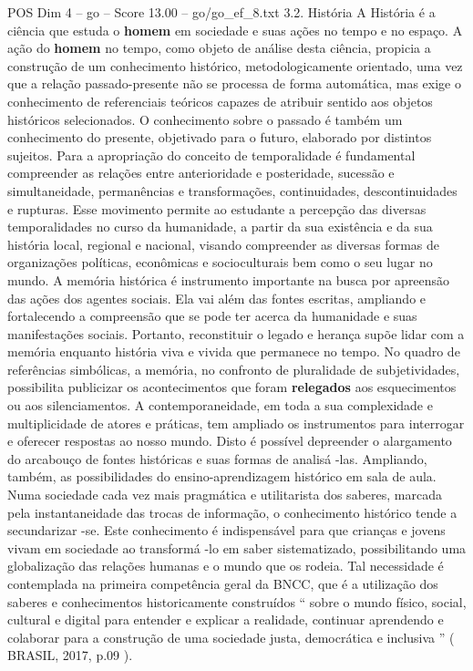 \begin{textsample}{POS Dim 4 – go – Score 13.00 – go/go\_ef\_8.txt}  \label{ex:f4_pos_067}
3.2.
História A História é a ciência que estuda o \textbf{homem} em sociedade e suas ações no tempo e no espaço.
A ação do \textbf{homem} no tempo, como objeto de análise desta ciência, propicia a construção de um conhecimento histórico, metodologicamente orientado, uma vez que a relação passado-presente não se processa de forma automática, mas exige o conhecimento de referenciais teóricos capazes de atribuir sentido aos objetos históricos selecionados.
O conhecimento sobre o passado é também um conhecimento do presente, objetivado para o futuro, elaborado por distintos sujeitos.
Para a apropriação do conceito de temporalidade é fundamental compreender as relações entre anterioridade e posteridade, sucessão e simultaneidade, permanências e transformações, continuidades, descontinuidades e rupturas.
Esse movimento permite ao estudante a percepção das diversas temporalidades no curso da humanidade, a partir da sua existência e da sua história local, regional e nacional, visando compreender as diversas formas de organizações políticas, econômicas e socioculturais bem como o seu lugar no mundo.
A memória histórica é instrumento importante na busca por apreensão das ações dos agentes sociais.
Ela vai além das fontes escritas, ampliando e fortalecendo a compreensão que se pode ter acerca da humanidade e suas manifestações sociais.
Portanto, reconstituir o legado e herança supõe lidar com a memória enquanto história viva e vivida que permanece no tempo.
No quadro de referências simbólicas, a memória, no confronto de pluralidade de subjetividades, possibilita publicizar os acontecimentos que foram \textbf{relegados} aos esquecimentos ou aos silenciamentos.
A contemporaneidade, em toda a sua complexidade e multiplicidade de atores e práticas, tem ampliado os instrumentos para interrogar e oferecer respostas ao nosso mundo.
Disto é possível depreender o alargamento do arcabouço de fontes históricas e suas formas de analisá -las.
Ampliando, também, as possibilidades do ensino-aprendizagem histórico em sala de aula.
Numa sociedade cada vez mais pragmática e utilitarista dos saberes, marcada pela instantaneidade das trocas de informação, o conhecimento histórico tende a secundarizar -se.
Este conhecimento é indispensável para que crianças e jovens vivam em sociedade ao transformá -lo em saber sistematizado, possibilitando uma globalização das relações humanas e o mundo que os rodeia.
Tal necessidade é contemplada na primeira competência geral da BNCC, que é a utilização dos saberes e conhecimentos historicamente construídos “ sobre o mundo físico, social, cultural e digital para entender e explicar a realidade, continuar aprendendo e colaborar para a construção de uma sociedade justa, democrática e inclusiva ” ( BRASIL, 2017, p.09 ).

\end{textsample}
